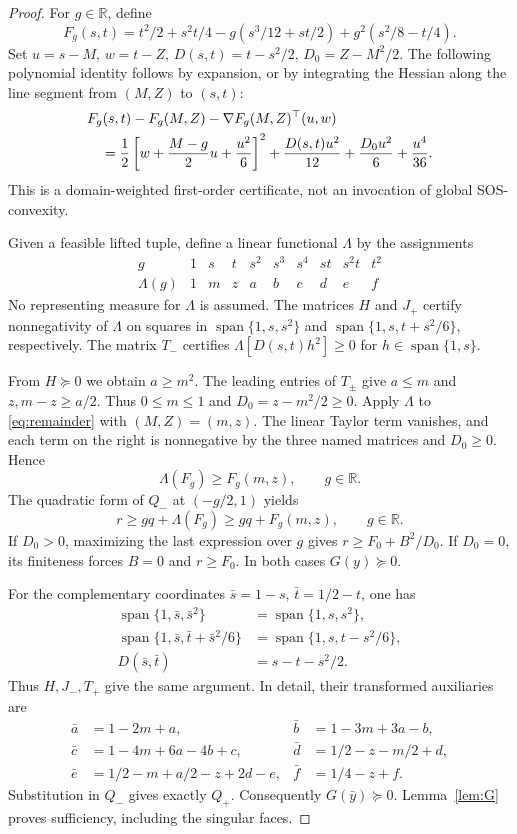 \documentclass[pdflatex,sn-mathphys-num]{sn-jnl}
\theoremstyle{thmstyleone}
\theoremstyle{thmstyletwo}\newtheorem{remark}[theorem]{Remark}
\newcommand{\R}{\mathbb R}
\newcommand{\spn}{\operatorname{span}}
\begin{document}
\begin{proof}
For $g\in\R$, define
\[
 F_g(s,t)=t^2/2+s^2t/4-g(s^3/12+st/2)
             +g^2(s^2/8-t/4).
\]
Set $u=s-M$, $w=t-Z$, $D(s,t)=t-s^2/2$, $D_0=Z-M^2/2$.
The following polynomial identity follows by expansion, or by integrating
the Hessian along the line segment from $(M,Z)$ to $(s,t)$:
\begin{align}
 &F_g(s,t)-F_g(M,Z)-\nabla F_g(M,Z)^\top(u,w)\notag\\
 &\quad=\frac12\left[w+\frac{M-g}{2}u+\frac{u^2}{6}\right]^2
       +\frac{D(s,t)u^2}{12}+\frac{D_0u^2}{6}+\frac{u^4}{36}.
       \label{eq:remainder}
\end{align}
This is a domain-weighted first-order certificate, not an invocation of
global SOS-convexity.

Given a feasible lifted tuple, define a linear functional $\Lambda$ by the
assignments
\[
\begin{array}{c|rrrrrrrrr}
g&1&s&t&s^2&s^3&s^4&st&s^2t&t^2\\
\Lambda(g)&1&m&z&a&b&c&d&e&f
\end{array}
\]
No representing measure for $\Lambda$ is assumed. The matrices $H$ and $J_+$
certify nonnegativity of $\Lambda$
on squares in $\spn\{1,s,s^2\}$ and $\spn\{1,s,t+s^2/6\}$, respectively.
The matrix $T_-$ certifies $\Lambda[D(s,t)h^2]\ge0$ for
$h\in\spn\{1,s\}$.

From $H\succeq0$ we obtain $a\ge m^2$. The leading entries of $T_\pm$
give $a\le m$ and $z,m-z\ge a/2$. Thus $0\le m\le1$ and
$D_0=z-m^2/2\ge0$. Apply $\Lambda$ to \eqref{eq:remainder} with
$(M,Z)=(m,z)$. The linear Taylor term vanishes, and each term on the right
is nonnegative by the three named matrices and $D_0\ge0$. Hence
\begin{equation}\label{eq:jensen}
 \Lambda(F_g)\ge F_g(m,z),\qquad g\in\R.
\end{equation}
The quadratic form of $Q_-$ at $(-g/2,1)$ yields
\begin{equation}\label{eq:allg}
 r\ge gq+\Lambda(F_g)\ge gq+F_g(m,z),\qquad g\in\R.
\end{equation}
If $D_0>0$, maximizing the last expression over $g$ gives
$r\ge F_0+B^2/D_0$. If $D_0=0$, its finiteness forces $B=0$ and
$r\ge F_0$. In both cases $G(y)\succeq0$.

For the complementary coordinates $\bar s=1-s$, $\bar t=1/2-t$, one has
\begin{align*}
 \spn\{1,\bar s,\bar s^2\}&=\spn\{1,s,s^2\},\\
 \spn\{1,\bar s,\bar t+\bar s^2/6\}&=\spn\{1,s,t-s^2/6\},\\
 D(\bar s,\bar t)&=s-t-s^2/2.
\end{align*}
Thus $H,J_-,T_+$ give the same argument. In detail, their transformed
auxiliaries are
\begin{align*}
 \bar a&=1-2m+a,&\bar b&=1-3m+3a-b,\\
 \bar c&=1-4m+6a-4b+c,&\bar d&=1/2-z-m/2+d,\\
 \bar e&=1/2-m+a/2-z+2d-e,&\bar f&=1/4-z+f.
\end{align*}
Substitution in $Q_-$ gives exactly $Q_+$. Consequently
$G(\bar y)\succeq0$. Lemma~\ref{lem:G} proves sufficiency, including the
singular faces.


\end{proof}
\end{document}
